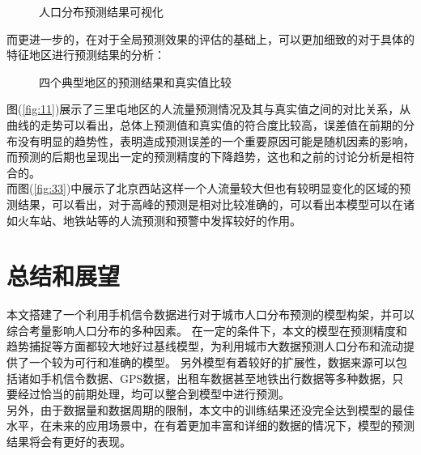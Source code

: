 \begin{figure}[ht]
\centering
{}
\hfill
\caption{人口分布预测结果可视化}
\label{fig:peopleheatmap}
\end{figure}
而更进一步的，在对于全局预测效果的评估的基础上，可以更加细致的对于具体的特征地区进行预测结果的分析：
\begin{figure}[ht]
\centering
{}
\hfill
{}
\caption{四个典型地区的预测结果和真实值比较}
\label{fig:region}
\end{figure}
图(\ref{fig:11})展示了三里屯地区的人流量预测情况及其与真实值之间的对比关系，从曲线的走势可以看出，总体上预测值和真实值的符合度比较高，误差值在前期的分布没有明显的趋势性，表明造成预测误差的一个重要原因可能是随机因素的影响，而预测的后期也呈现出一定的预测精度的下降趋势，这也和之前的讨论分析是相符合的。\\
\indent 而图(\ref{fig:33})中展示了北京西站这样一个人流量较大但也有较明显变化的区域的预测结果，可以看出，对于高峰的预测是相对比较准确的，可以看出本模型可以在诸如火车站、地铁站等的人流预测和预警中发挥较好的作用。

\section{总结和展望}
本文搭建了一个利用手机信令数据进行对于城市人口分布预测的模型构架，并可以综合考量影响人口分布的多种因素。 在一定的条件下，本文的模型在预测精度和趋势捕捉等方面都较大地好过基线模型，为利用城市大数据预测人口分布和流动提供了一个较为可行和准确的模型。 另外模型有着较好的扩展性，数据来源可以包括诸如手机信令数据、GPS数据，出租车数据甚至地铁出行数据等多种数据，只要经过恰当的前期处理，均可以整合到模型中进行预测。\\
\indent 另外，由于数据量和数据周期的限制，本文中的训练结果还没完全达到模型的最佳水平，在未来的应用场景中，在有着更加丰富和详细的数据的情况下，模型的预测结果将会有更好的表现。